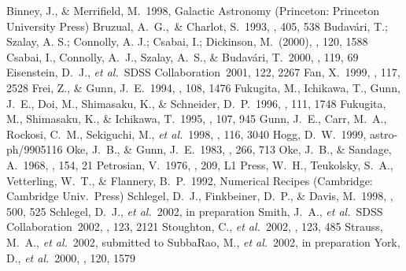 Binney, J., \& Merrifield, M.~1998, Galactic Astronomy (Princeton:
Princeton University Press)
Bruzual, A.~G.,~\& Charlot, S.~1993, \apj, {405}, 538
Budav\'ari, T.; Szalay, A. S.; Connolly, A. J.; Csabai, I.; Dickinson,
M.~(2000), \aj, 120, 1588
Csabai, I., Connolly, A.~J., Szalay, A.~S., \& Budav\'ari,
T.~2000, \aj, 119, 69
Eisenstein, D.~J., {\it et al.}~SDSS Collaboration~2001, 122, 2267
Fan, X.~1999, \aj, 117, 2528
Frei, Z., \& Gunn, J.~E.~1994, \aj, 108, 1476
Fukugita, M., Ichikawa, T., Gunn, J.~E., Doi, M., Shimasaku, K., \&
Schneider, D.~P.~1996, \aj, 111, 1748
Fukugita, M., Shimasaku, K., \& Ichikawa, T.~1995, \pasp, 107, 945
Gunn, J.~E., Carr, M.~A., Rockosi, C.~M., Sekiguchi, M., {\it et al.}~1998, \aj, 116, 3040
Hogg, D.~W.~1999, astro-ph/9905116 
Oke, J.~B., \& Gunn, J.~E.~1983, \apj, 266, 713
Oke, J.~B., \& Sandage, A.~1968, \apj, 154, 21
Petrosian, V.~1976, \apj, 209, L1
Press, W.~H., Teukolsky, S.~A., Vetterling, W.~T., \& Flannery,
B.~P.~1992, Numerical Recipes (Cambridge: Cambridge Univ.~Press)
Schlegel, D.~J., Finkbeiner, D.~P., \& Davis, M.~1998, \apj, 500, 525
Schlegel, D.~J., {\it et al.}~2002, in preparation
Smith, J.~A., {\it et al.}~SDSS Collaboration~2002, \aj, 123, 2121
Stoughton, C., {\it et al.}~2002, \aj, 123, 485
Strauss, M.~A., {\it et al.}~2002, submitted to \aj
{}
SubbaRao, M., {\it et al.}~2002, in preparation
York, D., {\it et al.}~2000, \aj, 120, 1579
